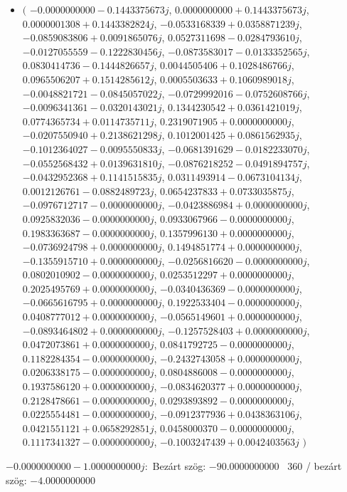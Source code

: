 \documentclass[14pt,a4paper]{article}
\begin{document}
\begin{itemize}
\item
$\big($
$-0.0000000000-0.1443375673j$, $0.0000000000+0.1443375673j$, $0.0000001308+0.1443382824j$, $-0.0533168339+0.0358871239j$, $-0.0859083806+0.0091865076j$, $0.0527311698-0.0284793610j$, $-0.0127055559-0.1222830456j$, $-0.0873583017-0.0133352565j$, $0.0830414736-0.1444826657j$, $0.0044505406+0.1028486766j$, $0.0965506207+0.1514285612j$, $0.0005503633+0.1060989018j$, $-0.0048821721-0.0845057022j$, $-0.0729992016-0.0752608766j$, $-0.0096341361-0.0320143021j$, $0.1344230542+0.0361421019j$, $0.0774365734+0.0114735711j$, $0.2319071905+0.0000000000j$, $-0.0207550940+0.2138621298j$, $0.1012001425+0.0861562935j$, $-0.1012364027-0.0095550833j$, $-0.0681391629-0.0182233070j$, $-0.0552568432+0.0139631810j$, $-0.0876218252-0.0491894757j$, $-0.0432952368+0.1141515835j$, $0.0311493914-0.0673104134j$, $0.0012126761-0.0882489723j$, $0.0654237833+0.0733035875j$, $-0.0976712717-0.0000000000j$, $-0.0423886984+0.0000000000j$, $0.0925832036-0.0000000000j$, $0.0933067966-0.0000000000j$, $0.1983363687-0.0000000000j$, $0.1357996130+0.0000000000j$, $-0.0736924798+0.0000000000j$, $0.1494851774+0.0000000000j$, $-0.1355915710+0.0000000000j$, $-0.0256816620-0.0000000000j$, $0.0802010902-0.0000000000j$, $0.0253512297+0.0000000000j$, $0.2025495769+0.0000000000j$, $-0.0340436369-0.0000000000j$, $-0.0665616795+0.0000000000j$, $0.1922533404-0.0000000000j$, $0.0408777012+0.0000000000j$, $-0.0565149601+0.0000000000j$, $-0.0893464802+0.0000000000j$, $-0.1257528403+0.0000000000j$, $0.0472073861+0.0000000000j$, $0.0841792725-0.0000000000j$, $0.1182284354-0.0000000000j$, $-0.2432743058+0.0000000000j$, $0.0206338175-0.0000000000j$, $0.0804886008-0.0000000000j$, $0.1937586120+0.0000000000j$, $-0.0834620377+0.0000000000j$, $0.2128478661-0.0000000000j$, $0.0293893892-0.0000000000j$, $0.0225554481-0.0000000000j$, $-0.0912377936+0.0438363106j$, $0.0421551121+0.0658292851j$, $0.0458000370-0.0000000000j$, $0.1117341327-0.0000000000j$, $-0.1003247439+0.0042403563j$
$\big)$
\end{itemize}
$-0.0000000000-1.0000000000j$:\
Bezárt szög: $-90.0000000000$ \
360 / bezárt szög: $-4.0000000000$\
\end{document}

